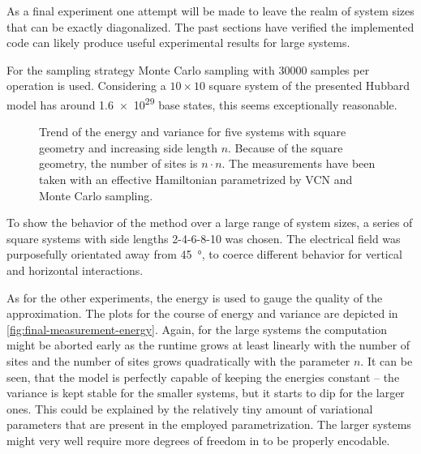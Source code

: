 As a final experiment one attempt will be made to leave the realm of system sizes that can be exactly diagonalized.
The past sections have verified the implemented code can likely produce useful experimental results for large systems.

For the sampling strategy Monte Carlo sampling with \num{30000} samples per operation is used.
Considering a $10\times{}10$ square system of the presented Hubbard model has around \num{1.6e29} base states, this seems exceptionally reasonable.

\begin{figure}[htbp]
    \centering
    \vspace{-0.3cm}
    \caption{
            Trend of the energy and variance for five systems with square geometry and increasing side length $n$.
            Because of the square geometry, the number of sites is $n\cdot n $.
            The measurements have been taken with an effective Hamiltonian parametrized by VCN and Monte Carlo sampling.
        }
    \label{fig:final-measurement-energy}
\end{figure}

To show the behavior of the method over a large range of system sizes, a series of square systems with side lengths 2-4-6-8-10 was chosen.
The electrical field was purposefully orientated away from \SI{45}{\degree}, to coerce different behavior for vertical and horizontal interactions.

As for the other experiments, the energy is used to gauge the quality of the approximation. 
The plots for the course of energy and variance are depicted in \autoref{fig:final-measurement-energy}.
Again, for the large systems the computation might be aborted early as the runtime grows at least linearly with the number of sites and the number of sites grows quadratically with the parameter $n$.
It can be seen, that the model is perfectly capable of keeping the energies constant -- the variance is kept stable for the smaller systems, but it starts to dip for the larger ones.
This could be explained by the relatively tiny amount of variational parameters that are present in the employed parametrization.
The larger systems might very well require more degrees of freedom in \Hvcn{\vec{\eta}} to be properly encodable.

